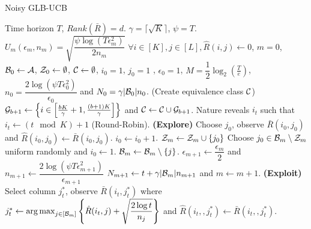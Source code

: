 \begin{algorithm}[!th]
\caption{Noisy GLB-UCB}
\label{alg:NGLB}
\begin{algorithmic}[1]
 Time horizon $T$, $Rank(\bar{R}) = d$.
 $\gamma = \lceil\sqrt{K} \rceil$, $\psi = T$.
 $U_m(\epsilon_m, n_m) = \sqrt{\dfrac{\psi\log(T\epsilon_m^2)}{2n_m} }$
 $\forall i\in [K], j\in [L], \hat{R}(i,j) \leftarrow 0$, $m=0$, $\mathcal{B}_0 \leftarrow \mathcal{A}$, $\mathcal{Z}_0 \leftarrow \emptyset$, $\mathcal{C} \leftarrow \emptyset$,  $i_0=1$, $j_0=1$ , $\epsilon_0 = 1$, $M=\dfrac{1}{2}\log_2\left( \frac{T}{e}\right)$, $n_0 = \dfrac{2\log(\psi T\epsilon_{0}^2)}{\epsilon_{0}} $ and $N_0 = \gamma |\mathcal{B}_0|n_0$.
 (Create equivalence class $\mathcal{C}$)
\State  $\mathcal{G}_{b+1}\leftarrow \left\lbrace i\in \left[\frac{bK}{\gamma}+1,\frac{(b+1)K}{\gamma}\right]\right\rbrace$ and $\mathcal{C}\leftarrow \mathcal{C}\cup \mathcal{G}_{b+1}$.
\EndFor
{}	
\State Nature reveals $i_t$ such that $i_t \leftarrow (t \mod K) + 1$ (Round-Robin).
 \textbf{ (Explore) }
\State Choose $j_0$, observe $\bar{R}(i_0,j_0)$ and $\hat{R}(i_0,j_0)\leftarrow \bar{R}(i_0,j_0)$.
\State $i_0 \leftarrow i_0 + 1$.
\Else
\State $\mathcal{Z}_m \leftarrow \mathcal{Z}_m \cup \lbrace j_0\rbrace$
\State Choose $j_0\in\mathcal{B}_m\setminus \mathcal{Z}_m$ uniform randomly and $i_0 \leftarrow 1$.
\EndIf
\Else
\ColElim
\State {}
\State {}
\State $\mathcal{B}_m \leftarrow \mathcal{B}_m \setminus \lbrace j \rbrace$. 
\EndWhile
\EndFor
\EndColElim
\ResParam
\State $\epsilon_{m+1} \leftarrow \dfrac{\epsilon_m}{2}$ and $n_{m+1} \leftarrow \dfrac{2\log(\psi T\epsilon_{m+1}^2)}{\epsilon_{m+1}}$
\State $N_{m+1} \leftarrow t + \gamma |\mathcal{B}_m|n_{m+1}$ and $m \leftarrow m + 1$.
\EndResParam
\EndIf
\Else \textbf{ (Exploit) }
\State  Select column $j_t^*$, observe $\bar{R}(i_t,j_t^*)$ where $j_t^* \leftarrow \mathop{\rm arg\,max}_{j\in[\mathcal{B}_m]} \left\lbrace \hat{R}(i_t,j) + \sqrt{\dfrac{2\log t}{n_j}}\right\rbrace$ and $\hat{R}(i_t,,j_t^*)\leftarrow \bar{R}(i_t,,j_t^*)$.
\EndIf
\EndFor
\end{algorithmic}
\end{algorithm}


